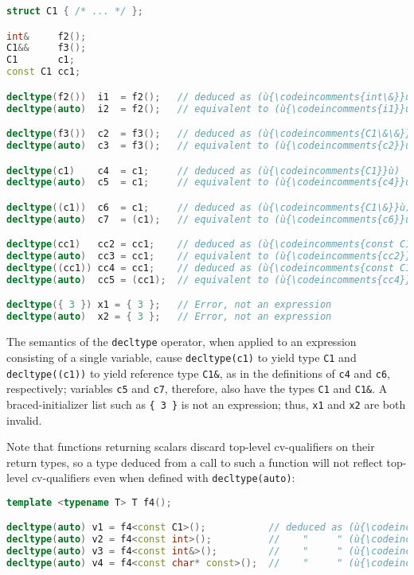 \begin{lstlisting}[language=C++]
struct C1 { /* ... */ };

int&     f2();
C1&&     f3();
C1       c1;
const C1 cc1;

decltype(f2())  i1  = f2();   // deduced as (ù{\codeincomments{int\&}}ù)
decltype(auto)  i2  = f2();   // equivalent to (ù{\codeincomments{i1}}ù)

decltype(f3())  c2  = f3();   // deduced as (ù{\codeincomments{C1\&\&}}ù)
decltype(auto)  c3  = f3();   // equivalent to (ù{\codeincomments{c2}}ù)

decltype(c1)    c4  = c1;     // deduced as (ù{\codeincomments{C1}}ù)
decltype(auto)  c5  = c1;     // equivalent to (ù{\codeincomments{c4}}ù)

decltype((c1))  c6  = c1;     // deduced as (ù{\codeincomments{C1\&}}ù)
decltype(auto)  c7  = (c1);   // equivalent to (ù{\codeincomments{c6}}ù)

decltype(cc1)   cc2 = cc1;    // deduced as (ù{\codeincomments{const C1}}ù)
decltype(auto)  cc3 = cc1;    // equivalent to (ù{\codeincomments{cc2}}ù)
decltype((cc1)) cc4 = cc1;    // deduced as (ù{\codeincomments{const C1\&}}ù)
decltype(auto)  cc5 = (cc1);  // equivalent to (ù{\codeincomments{cc4}}ù)

decltype({ 3 }) x1 = { 3 };   // Error, not an expression
decltype(auto)  x2 = { 3 };   // Error, not an expression
\end{lstlisting}
    

The semantics of the \lstinline!decltype! operator, when applied to an
expression consisting of a single variable, cause \lstinline!decltype(c1)!
to yield type \lstinline!C1! and \lstinline!decltype((c1))! to yield reference
type \lstinline!C1&!, as in the definitions of \lstinline!c4! and
\lstinline!c6!, respectively; variables \lstinline!c5! and \lstinline!c7!,
therefore, also have the types \lstinline!C1! and \lstinline!C1&!. A
braced-initializer list such as \lstinline!{!~\lstinline!3!~\lstinline!}! is not
an expression; thus, \lstinline!x1! and \lstinline!x2! are both invalid.

Note that functions returning scalars discard top-level cv-qualifiers on
their return types, so a type deduced from a call to such a function
will not reflect top-level cv-qualifiers even when defined with
\lstinline!decltype(auto)!:

\begin{lstlisting}[language=C++]
template <typename T> T f4();

decltype(auto) v1 = f4<const C1>();           // deduced as (ù{\codeincomments{const C1}}ù)
decltype(auto) v2 = f4<const int>();          //    "     " (ù{\codeincomments{int}}ù)
decltype(auto) v3 = f4<const int&>();         //    "     " (ù{\codeincomments{const int\&}}ù)
decltype(auto) v4 = f4<const char* const>();  //    "     " (ù{\codeincomments{const char*}}ù)
\end{lstlisting}
    

